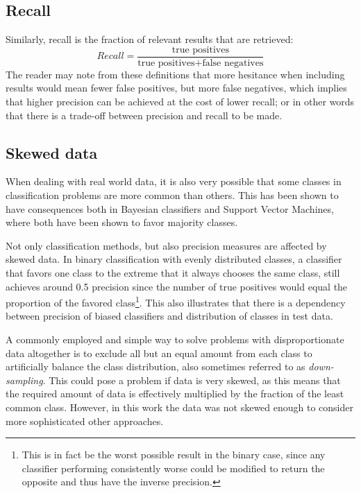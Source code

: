 \documentclass[a4paper,11pt]{kth-mag}
\begin{document}
\subsection{Recall}
Similarly, recall is the fraction of relevant results that are retrieved:
$$Recall = \frac{\text {true positives}}{\text{true positives} + \text{false negatives}}$$
The reader may note from these definitions that more hesitance when including results would mean fewer false positives, but more false negatives, which implies that higher precision can be achieved at the cost of lower recall; or in other words that there is a trade-off between precision and recall to be made.


\subsection{Skewed data}
\label{subsec:bias}
When dealing with real world data, it is also very possible that some classes in classification problems are more common than others. This has been shown to have consequences both in Bayesian classifiers\cite{rennie2003bias} and Support Vector Machines\cite{svm_bias}, where both have been shown to favor majority classes\cite{rennie2003bias, svm_bias}.

Not only classification methods, but also precision measures are affected by skewed data. In binary classification with evenly distributed classes, a classifier that favors one class to the extreme that it always chooses the same class, still achieves around 0.5 precision since the number of true positives would equal the proportion of the favored class\footnote{This is in fact be the worst possible result in the binary case, since any classifier performing consistently worse could be modified to return the opposite and thus have the inverse precision.}. This also illustrates that there is a dependency between precision of biased classifiers and distribution of classes in test data.

A commonly employed and simple way to solve problems with disproportionate data altogether is to exclude all but an equal amount from each class to artificially balance the class distribution, also sometimes referred to as \emph{down-sampling}\cite{provost2000machine}. This could pose a problem if data is very skewed, as this means that the required amount of data is effectively multiplied by the fraction of the least common class. However, in this work the data was not skewed enough to consider more sophisticated other approaches.
\end{document}
